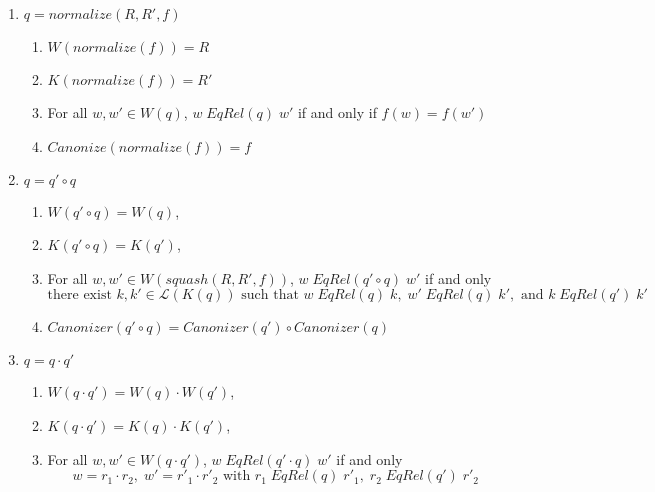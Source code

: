 \documentclass{svproc}
\begin{document}
\begin{enumerate}
\item $q = normalize(R, R', f)$
\begin{center}
\begin{enumerate}
  \item
$W(normalize(f)) = R$
\item
$K(normalize(f)) = R'$
\item For all $w, w' \in W(q)$, $w \; EqRel(q) \; w'$ if and only if
$f(w)=f(w')$
\item
$Canonize(normalize(f)) = f$
\begin{prooftree}
\end{prooftree}
\end{enumerate}
\end{center}
\item $q=q' \circ q$
\begin{center}
\begin{enumerate}
  \item $W(q' \circ q) = W(q)$,
  \item $K(q' \circ q) = K(q')$, 
  \item
For all $w, w' \in W(squash(R, R', f))$, $w \; EqRel(q' \circ q) \; w'$ if and
only $$\text{there exist }k, k' \in
  \mathcal{L}(K(q)) \text{ such that } w \; EqRel(q) \; k, \; w' \;
  EqRel(q) \; k', \text{ and } k \; EqRel(q') \; k' $$
\item
$Canonizer(q' \circ q) = Canonizer(q') \circ Canonizer(q)
$
\end{enumerate}
\begin{prooftree}
\end{prooftree}
\end{center}
\item $q=q \cdot q'$
\begin{center}
\begin{enumerate}
  \item $W(q \cdot q') = W(q) \cdot W(q')$,
  \item $K(q \cdot q') = K(q) \cdot K(q')$, 
  \item
For all $w, w' \in W(q \cdot q')$, $w \; EqRel(q' \cdot q) \; w'$ if and
only $$w = r_1
      \cdot r_2, \; w' = {r'}_1 \cdot {r'}_2 \text{ with } r_1 \; EqRel(q) \;
      {r'}_1, \; r_2 \; EqRel(q') \; {r'}_2$$

\end{enumerate}
\end{center}
\end{enumerate}
\end{document}
